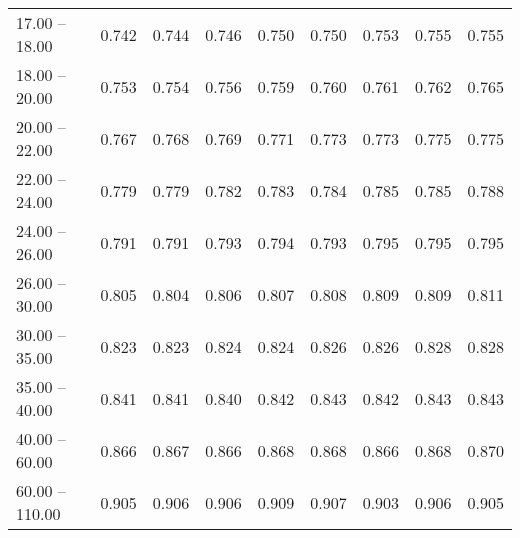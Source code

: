 \begin{table}[htp]
\begin{tiny}
\begin{center}
\begin{tabular}{|l|c|c|c|c|c|c|c|c|}
      17.00 -- 18.00 &  0.742 & 0.744 & 0.746 & 0.750 & 0.750 & 0.753 & 0.755 & 0.755 \\ 
      18.00 -- 20.00 &  0.753 & 0.754 & 0.756 & 0.759 & 0.760 & 0.761 & 0.762 & 0.765 \\ 
      20.00 -- 22.00 &  0.767 & 0.768 & 0.769 & 0.771 & 0.773 & 0.773 & 0.775 & 0.775 \\ 
      22.00 -- 24.00 &  0.779 & 0.779 & 0.782 & 0.783 & 0.784 & 0.785 & 0.785 & 0.788 \\ 
      24.00 -- 26.00 &  0.791 & 0.791 & 0.793 & 0.794 & 0.793 & 0.795 & 0.795 & 0.795 \\ 
      26.00 -- 30.00 &  0.805 & 0.804 & 0.806 & 0.807 & 0.808 & 0.809 & 0.809 & 0.811 \\ 
      30.00 -- 35.00 &  0.823 & 0.823 & 0.824 & 0.824 & 0.826 & 0.826 & 0.828 & 0.828 \\ 
      35.00 -- 40.00 &  0.841 & 0.841 & 0.840 & 0.842 & 0.843 & 0.842 & 0.843 & 0.843 \\ 
      40.00 -- 60.00 &  0.866 & 0.867 & 0.866 & 0.868 & 0.868 & 0.866 & 0.868 & 0.870 \\ 
      60.00 -- 110.00 &  0.905 & 0.906 & 0.906 & 0.909 & 0.907 & 0.903 & 0.906 & 0.905 \\ 
\hline
\end{tabular} 
             \end{center} 
             \end{tiny} 
             \label{tab:sa_long_psi2s8} 
             \end{table}


